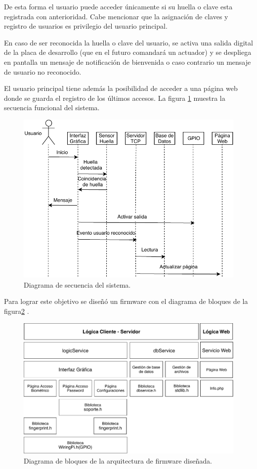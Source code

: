 De esta forma el usuario puede acceder únicamente si su huella  o clave esta registrada con anterioridad. Cabe mencionar que la asignación de claves y registro de usuarios es privilegio del usuario principal.

En caso de ser reconocida la huella o clave del usuario, se activa una salida digital de la placa de desarrollo (que en el futuro comandará un actuador) y se despliega en pantalla un mensaje de notificación de bienvenida o caso contrario un mensaje de usuario no reconocido.

El usuario principal tiene además la posibilidad de acceder a una página web donde se guarda el registro de los últimos accesos.
La figura \ref{fig:funcional} muestra la secuencia funcional del sistema.

\begin{figure}[h]
	\centering
	\includegraphics[scale=.9]{./Figures/funcional.pdf}
	\caption{Diagrama de secuencia del sistema.}
	\label{fig:funcional}
\end{figure}

Para lograr este objetivo se diseñó un firmware con el diagrama de bloques de la figura\ref{fig:bloques} .

\begin{figure}[H]
	\centering
	\includegraphics[scale=.6]{./Figures/bloques.pdf}
	\caption{Diagrama de bloques de la arquitectura de firmware diseñada.}
	\label{fig:bloques}
\end{figure}

